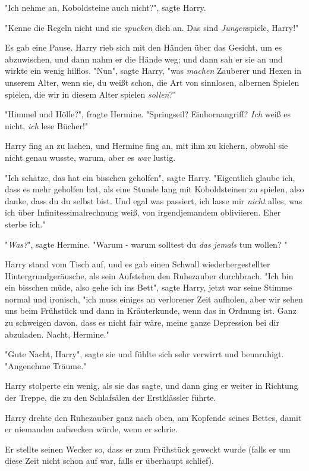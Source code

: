 {"Ich nehme an, Koboldsteine auch nicht?", sagte Harry.

"Kenne die Regeln nicht und sie \emph{spucken} dich an. Das sind \emph{Jungen}spiele, Harry!"

Es gab eine Pause. Harry rieb sich mit den Händen über das Gesicht, um es abzuwischen, und dann nahm er die Hände weg; und dann sah er sie an und wirkte ein wenig hilflos. "Nun", sagte Harry, "was \emph{machen} Zauberer und Hexen in unserem Alter, wenn sie, du weißt schon, die Art von sinnlosen, albernen Spielen spielen, die wir in diesem Alter spielen \emph{sollen}?"

"Himmel und Hölle?", fragte Hermine. "Springseil? Einhornangriff? \emph{Ich} weiß es nicht, \emph{ich} lese Bücher!"

Harry fing an zu lachen, und Hermine fing an, mit ihm zu kichern, obwohl sie nicht genau wusste, warum, aber es \emph{war} lustig.

"Ich schätze, das hat ein bisschen geholfen", sagte Harry. "Eigentlich glaube ich, dass es mehr geholfen hat, als eine Stunde lang mit Koboldsteinen zu spielen, also danke, dass du du selbst bist. Und egal was passiert, ich lasse mir \emph{nicht} alles, was ich über Infinitessimalrechnung weiß, von irgendjemandem obliviieren. Eher sterbe ich."

"\emph{Was?}", sagte Hermine. "Warum - warum solltest du \emph{das} \emph{jemals} tun wollen? "

Harry stand vom Tisch auf, und es gab einen Schwall wiederhergestellter Hintergrundgeräusche, als sein Aufstehen den Ruhezauber durchbrach. "Ich bin ein bisschen müde, also gehe ich ins Bett", sagte Harry, jetzt war seine Stimme normal und ironisch, "ich muss einiges an verlorener Zeit aufholen, aber wir sehen uns beim Frühstück und dann in Kräuterkunde, wenn das in Ordnung ist. Ganz zu schweigen davon, dass es nicht fair wäre, meine ganze Depression bei dir abzuladen. Nacht, Hermine."

"Gute Nacht, Harry", sagte sie und fühlte sich sehr verwirrt und beunruhigt. "Angenehme Träume."

Harry stolperte ein wenig, als sie das sagte, und dann ging er weiter in Richtung der Treppe, die zu den Schlafsälen der Erstklässler führte.

Harry drehte den Ruhezauber ganz nach oben, am Kopfende seines Bettes, damit er niemanden aufwecken würde, wenn er schrie.

Er stellte seinen Wecker so, dass er zum Frühstück geweckt wurde (falls er um diese Zeit nicht schon auf war, falls er überhaupt schlief).

}

